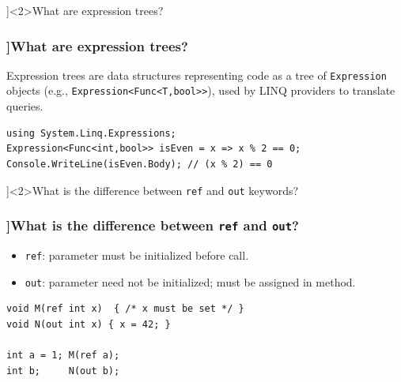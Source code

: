\QuestionSlide[\CategoryBadge[MetaColor!20]{Metaprogramming}]<2>{What are expression trees?}
\begin{frame}[fragile]
  \frametitle{\AnswerTitle[\CategoryBadge[MetaColor!20]{Metaprogramming}]{What are expression trees?}}

  {\footnotesize
    Expression trees are data structures representing code as a tree of \texttt{Expression} objects (e.g., \texttt{Expression<Func<T,bool>>}), used by LINQ providers to translate queries.
  }

  \begin{verbatim}
using System.Linq.Expressions;
Expression<Func<int,bool>> isEven = x => x % 2 == 0;
Console.WriteLine(isEven.Body); // (x % 2) == 0
  \end{verbatim}
\end{frame}

\QuestionSlide[\CategoryBadge[LangColor!20]{Language Feature}]<2>{What is the difference between \texttt{ref} and \texttt{out} keywords?}
\begin{frame}[fragile]
  \frametitle{\AnswerTitle[\CategoryBadge[LangColor!20]{Language Feature}]{What is the difference between \texttt{ref} and \texttt{out}?}}

  {\footnotesize
    \begin{itemize}
      \item \texttt{ref}: parameter must be initialized before call.
      \item \texttt{out}: parameter need not be initialized; must be assigned in method.
    \end{itemize}
  }

  \begin{verbatim}
void M(ref int x)  { /* x must be set */ }
void N(out int x) { x = 42; }

int a = 1; M(ref a);
int b;     N(out b);
  \end{verbatim}
\end{frame}

